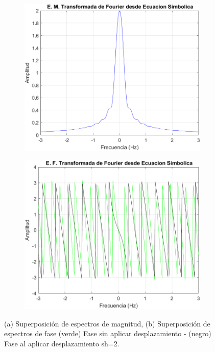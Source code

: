 \documentclass[11pt,letterpaper,twocolumn]{article}
\begin{document}
        \begin{figure}[H]
                \centering 
                \begin{subfigure}[h]{0.49\linewidth}
                    \includegraphics[width=\linewidth]{img/Proptiempomagnitud.png}
                    \label{P3}
                    \caption{}
                \end{subfigure}
                \begin{subfigure}[h]{0.49\linewidth}
                    \includegraphics[width=\linewidth]{img/Proptiempofase.png}
                    \label{P33}
                    \caption{}
                \end{subfigure}
                \caption{(a) Superposición de espectros de magnitud, (b) Superposición de espectros de fase (verde) Fase sin aplicar desplazamiento - (negro) Fase al aplicar desplazamiento sh=2.}
                \label{P33}
            \end{figure}
        
\end{document}
